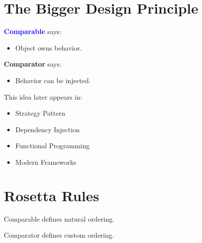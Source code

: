 \documentclass[11pt,a4paper]{book}
\begin{document}


\section{The Bigger Design Principle}

\textbf{\textcolor{blue}{Comparable}} says:

\begin{itemize}
    \item Object owns behavior.
\end{itemize}

\textbf{\textcolor{RosettaRoyalPurple}{Comparator}} says:

\begin{itemize}
    \item Behavior can be injected.
\end{itemize}

This idea later appears in:

\begin{itemize}
   \item \textcolor{RosettaDeepGreen}{Strategy Pattern}
    \item \textcolor{RosettaDeepGreen}{Dependency Injection}
    \item \textcolor{RosettaDeepGreen}{Functional Programming}
    \item \textcolor{RosettaDeepGreen}{Modern Frameworks}
\end{itemize}

\section{Rosetta Rules}

\begin{rosettarule}

Comparable defines natural ordering.

\end{rosettarule}


\begin{rosettarule}

Comparator defines custom ordering.

\end{rosettarule}

\end{document}
